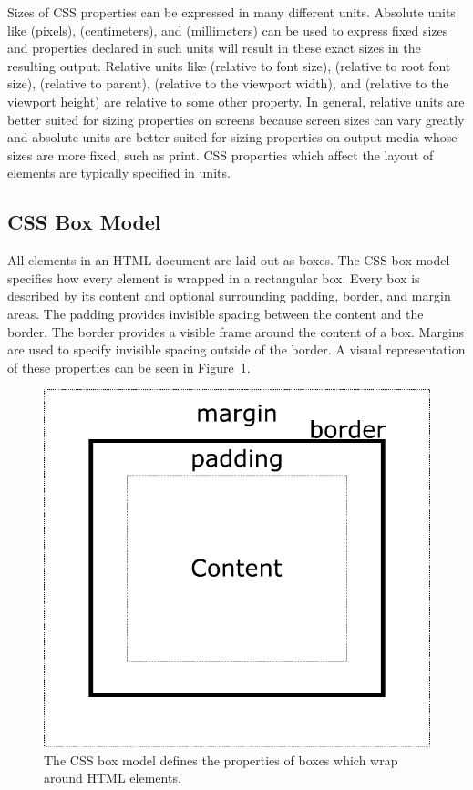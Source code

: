 Sizes of CSS properties can be expressed in many different units.
Absolute units like  (pixels),  (centimeters), and
 (millimeters) can be used to express fixed sizes and
properties declared in such units will result in these exact sizes in
the resulting output. Relative units like  (relative to font
size),  (relative to root font size), \code{\%} (relative to
parent),  (relative to the viewport width), and 
(relative to the viewport height) are relative to some other
property. In general, relative units are better suited for sizing
properties on screens because screen sizes can vary greatly and
absolute units are better suited for sizing properties on output media
whose sizes are more fixed, such as print. CSS properties which affect
the layout of elements are typically specified in  units.



\subsection{CSS Box Model}
\label{sec:BoxLayout}

All elements in an HTML document are laid out as boxes. The CSS box
model specifies how every element is wrapped in a rectangular box.
Every box is described by its content and optional surrounding
padding, border, and margin areas. The padding provides invisible
spacing between the content and the border. The border provides a
visible frame around the content of a box. Margins are used to specify
invisible spacing outside of the border. A visual representation of
these properties can be seen in Figure~\ref{fig:BoxModel}.

\begin{figure}[tp]
\centering
\includegraphics[keepaspectratio,width=\linewidth,height=\thirdh]
{diagrams/box-model.pdf}
\caption[CSS Box Model]{
The CSS box model defines the properties of boxes which wrap around HTML elements.
}
\label{fig:BoxModel}
\end{figure}

